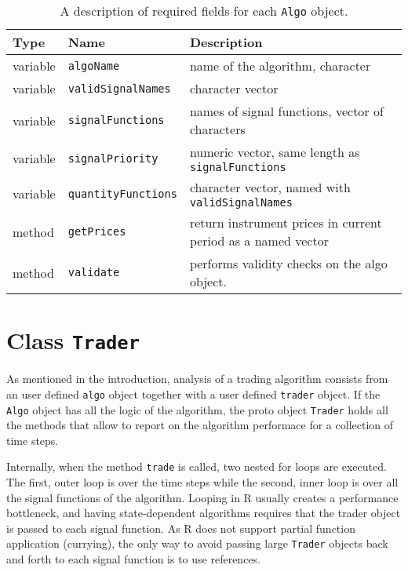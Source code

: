 \documentclass[nofootinbib]{revtex4}
\newcommand{\R}{{\normalfont\textsf{R }}{}}
\newcommand{\code}[1]{{\texttt{#1}}}
\begin{document}
\begin{table}
  \begin{center}
    \begin{tabular}{lll}
       Type & Name & Description \\ \hline
       variable & \code{algoName}  &  name of the algorithm, character \\
       variable & \code{validSignalNames} &  character vector \\
       variable & \code{signalFunctions}  &  names of signal functions, 
         vector of characters \\
       variable & \code{signalPriority}   &  numeric vector, same
         length as \code{signalFunctions} \\ 
       variable & \code{quantityFunctions} & character vector, named
         with \code{validSignalNames} \\
       method   & \code{getPrices} & return instrument prices in
         current period as a named vector \\
       method   & \code{validate} & performs validity checks on the
         algo object.  \\
       \hline
    \end{tabular}
  \end{center}
  \caption{A description of required fields for each \code{Algo} object.}
  \label{tab:Algo}
\end{table}  


\section{Class {\tt Trader}}
\label{Trader}

As mentioned in the introduction, analysis of a trading algorithm
consists from an user defined \code{algo} object together with a user
defined \code{trader} object.  If the \code{Algo} object has all the
logic of the algorithm, the proto object \code{Trader} holds all the
methods that allow to report on the algorithm performace for a
collection of time steps.

Internally, when the method \code{trade} is called, two nested for
loops are executed.  The first, outer loop is over the time steps
while the second, inner loop is over all the signal functions of the
algorithm.  Looping in R usually creates a performance bottleneck, and
having state-dependent algorithms requires that the trader object is
passed to each signal function.  As \R does not support partial
function application (currying), the only way to avoid passing large
\code{Trader} objects back and forth to each signal function is to use
references.
\end{document}
